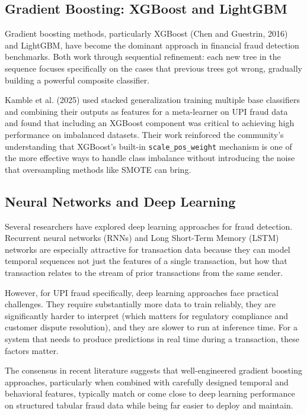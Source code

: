 \subsection{Gradient Boosting: XGBoost and LightGBM}

Gradient boosting methods, particularly XGBoost (Chen and Guestrin, 2016) \cite{chen2016} and LightGBM, have become the dominant approach in financial fraud detection benchmarks. Both work through sequential refinement: each new tree in the sequence focuses specifically on the cases that previous trees got wrong, gradually building a powerful composite classifier.

Kamble et al. (2025) \cite{kamble2025} used stacked generalization training multiple base classifiers and combining their outputs as features for a meta-learner on UPI fraud data and found that including an XGBoost component was critical to achieving high performance on imbalanced datasets. Their work reinforced the community's understanding that XGBoost's built-in \texttt{scale\_pos\_weight} mechanism is one of the more effective ways to handle class imbalance without introducing the noise that oversampling methods like SMOTE can bring.

\subsection{Neural Networks and Deep Learning}

Several researchers have explored deep learning approaches for fraud detection. Recurrent neural networks (RNNs) and Long Short-Term Memory (LSTM) networks are especially attractive for transaction data because they can model temporal sequences not just the features of a single transaction, but how that transaction relates to the stream of prior transactions from the same sender.

However, for UPI fraud specifically, deep learning approaches face practical challenges. They require substantially more data to train reliably, they are significantly harder to interpret (which matters for regulatory compliance and customer dispute resolution), and they are slower to run at inference time. For a system that needs to produce predictions in real time during a transaction, these factors matter.

The consensus in recent literature suggests that well-engineered gradient boosting approaches, particularly when combined with carefully designed temporal and behavioral features, typically match or come close to deep learning performance on structured tabular fraud data while being far easier to deploy and maintain.

